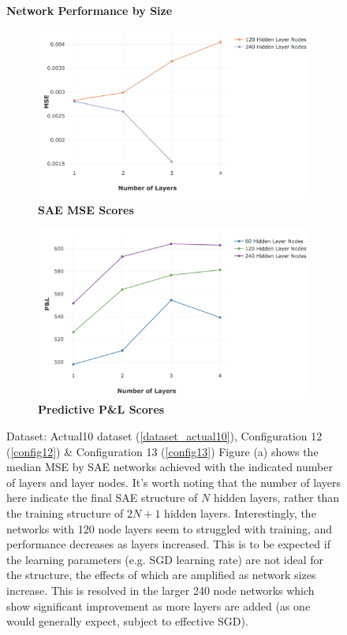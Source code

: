 \documentclass[a4paper,11pt,oneside]{article}
\theoremstyle{plain}
\theoremstyle{definition}
\begin{document}
	\begin{figure}[H]
		\centering
		\textbf{Network Performance by Size}
		\begin{subfigure}{.5\textwidth}
			\centering 
			\includegraphics[scale=0.25]{images/results/network/actual_mse_lines.png}
			\caption{\textbf{SAE MSE Scores} 
				\newline }
			\label{figure-actual_mse_lines}
		\end{subfigure}%
		\begin{subfigure}{.5\textwidth}
			\centering 
			\includegraphics[scale=0.26]{images/results/network/actual_pl_lines.png}
			\caption{\textbf{Predictive P\&L Scores} 
				\newline }
			\label{figure-actual_pl_lines}
		\end{subfigure}
		\caption[Network Performance by Size]
		{Dataset: Actual10 dataset (\ref{dataset_actual10}), Configuration 12 (\ref{config12}) \& Configuration 13 (\ref{config13})
			\newline Figure (a) shows the median MSE by SAE networks achieved with the indicated number of layers and layer nodes. It's worth noting that the number of layers here indicate the final SAE structure of $N$ hidden layers, rather than the training structure of $2N + 1$ hidden layers. Interestingly, the networks with 120 node layers seem to struggled with training, and performance decreases as layers increased. This is to be expected if the learning parameters (e.g. SGD  learning rate) are not ideal for the structure, the effects of which are amplified as network sizes increase. This is resolved in the larger 240 node networks which show significant improvement as more layers are added (as one would generally expect, subject to effective SGD).
}
\end{figure}
\end{document}
